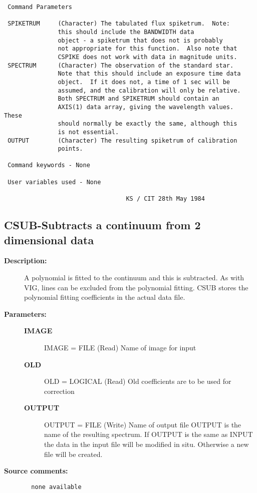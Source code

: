 \begin{description}
\begin{verbatim}
 Command Parameters

 SPIKETRUM     (Character) The tabulated flux spiketrum.  Note:
               this should include the BANDWIDTH data
               object - a spiketrum that does not is probably
               not appropriate for this function.  Also note that
               CSPIKE does not work with data in magnitude units.
 SPECTRUM      (Character) The observation of the standard star.
               Note that this should include an exposure time data
               object.  If it does not, a time of 1 sec will be
               assumed, and the calibration will only be relative.
               Both SPECTRUM and SPIKETRUM should contain an
               AXIS(1) data array, giving the wavelength values.  These
               should normally be exactly the same, although this
               is not essential.
 OUTPUT        (Character) The resulting spiketrum of calibration
               points.

 Command keywords - None

 User variables used - None

                                  KS / CIT 28th May 1984
\end{verbatim}
\end{description}
\subsection{CSUB-\label{CSUB}Subtracts a continuum from 2 dimensional data}
\begin{description}

\item [{\bf Description:}]
  A polynomial is
  fitted to the continuum and this is subtracted.
  As with VIG, lines can be excluded from the polynomial
  fitting. CSUB stores the polynomial fitting coefficients in
  the actual data file.

\item [{\bf Parameters:}]
\begin{description}
\item [{\bf IMAGE}]
    IMAGE = FILE (Read)
        Name of image for input
\item [{\bf OLD}]
    OLD = LOGICAL (Read)
        Old coefficients are to be used for correction
\item [{\bf OUTPUT}]
    OUTPUT = FILE (Write)
        Name of output file
            OUTPUT is the name of the resulting spectrum. If OUTPUT is the
            same as INPUT the data in the input file will be modified in
            situ. Otherwise a new file will be created.
\end{description}

\item [{\bf Source comments:}]
\begin{verbatim}
  none available

\end{verbatim}
\end{description}
